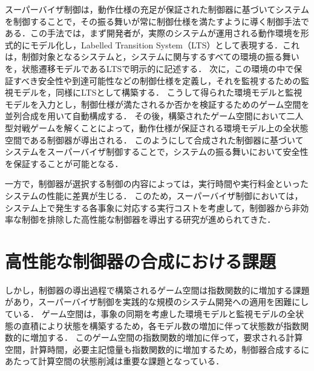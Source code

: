 \documentclass[11pt]{jarticle}
\begin{document}
スーパーバイザ制御は，動作仕様の充足が保証された制御器に基づいてシステムを制御することで，その振る舞いが常に制御仕様を満たすように導く制御手法である．この手法では，まず開発者が，実際のシステムが運用される動作環境を形式的にモデル化し，Labelled Transition System（LTS）として表現する．これは，制御対象となるシステムと，システムに関与するすべての環境の振る舞いを，状態遷移モデルであるLTSで明示的に記述する．
次に，この環境の中で保証すべき安全性や到達可能性などの制御仕様を定義し，それを監視するための監視モデルを，同様にLTSとして構築する．
こうして得られた環境モデルと監視モデルを入力とし，制御仕様が満たされるか否かを検証するためのゲーム空間を並列合成を用いて自動構成する．
その後，構築されたゲーム空間において二人型対戦ゲームを解くことによって，動作仕様が保証される環境モデル上の全状態空間である制御器が導出される．
このようにして合成された制御器に基づいてシステムをスーパーバイザ制御することで，システムの振る舞いにおいて安全性を保証することが可能となる．

一方で，制御器が選択する制御の内容によっては，実行時間や実行料金といったシステムの性能に差異が生じる．
このため，スーパーバイザ制御においては，システム上で発生する各事象に対応する実行コストを考慮して，制御器から非効率な制御を排除した高性能な制御器を導出する研究が進められてきた．


\section{高性能な制御器の合成における課題}
しかし，制御器の導出過程で構築されるゲーム空間は指数関数的に増加する課題があり，スーパーバイザ制御を実践的な規模のシステム開発への適用を困難にしている．
ゲーム空間は，事象の同期を考慮した環境モデルと監視モデルの全状態の直積により状態を構築するため，各モデル数の増加に伴って状態数が指数関数的に増加する．
このゲーム空間の指数関数的増加に伴って，要求される計算空間，計算時間，必要主記憶量も指数関数的に増加するため，制御器合成するにあたって計算空間の状態削減は重要な課題となっている．



\end{document}
